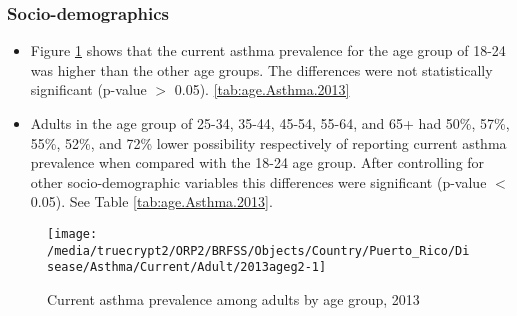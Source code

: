
\newpage
\subsubsection{Socio-demographics}

\begin{itemize}

\item Figure \ref{fig:age.Asthma.2013} shows that the current asthma prevalence for the age group of
18-24
was higher than the other age groups. The differences were not statistically significant (p-value $>$ 0.05). \ref{tab:age.Asthma.2013}

\item Adults in the age group of 25-34, 35-44, 45-54, 55-64, and 65+ had 50\%, 57\%, 55\%, 52\%, and 72\% lower possibility respectively of reporting current asthma prevalence when compared with the 18-24 age group. After controlling for other socio-demographic variables this differences were significant (p-value $<$ 0.05). See Table \ref{tab:age.Asthma.2013}.


\end{itemize}


\begin{figure}[H]
\caption{Current asthma prevalence among adults by age group, 
2013}
\begin{knitrout}
\color{fgcolor}

{\centering \texttt{[image: /media/truecrypt2/ORP2/BRFSS/Objects/Country/Puerto\_Rico/Disease/Asthma/Current/Adult/2013ageg2-1]} 

}



\end{knitrout}
\label{fig:age.Asthma.2013}
\end{figure}

